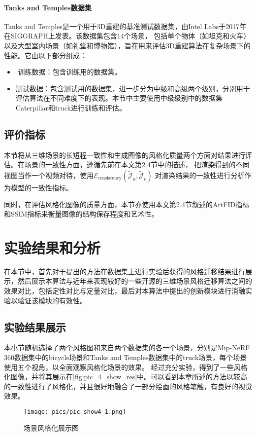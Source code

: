 \paragraph{Tanks and Temples数据集}
‌Tanks and Temples‌是一个用于3D重建的基准测试数据集，由Intel Labs于2017年在SIGGRAPH上发表。该数据集包含14个场景，
包括单个物体（如坦克和火车）以及大型室内场景（如礼堂和博物馆），旨在用来评估3D重建算法在复杂场景下的性能‌。它由以下部分组成：
\begin{itemize}
    \item‌ 训练数据：包含训练用的数据集。
    \item 测试数据：包含测试用的数据集，进一步分为中级和高级‌两个级别，分别用于评估算法在不同难度下的表现‌。本节中主要使用中级级别中的数据集Caterpillar和truck进行训练和评估。
\end{itemize}
\subsection{评价指标}
本节将从三维场景的长短程一致性和生成图像的风格化质量两个方面对结果进行评估。在场景的一致性方面，遵循先前在本文第2.4节中的描述，
把渲染得到的不同视图当作一个视频对待，使用\(\mathcal{E}_\text{consistency}(\tilde{\mathcal{J}}_u,\tilde{\mathcal{J}}_v)\)
对渲染结果的一致性进行分析作为模型的一致性指标。
\par 同时，在评估风格化图像的质量方面，本节亦使用本文第2.4节叙述的ArtFID指标和SSIM指标来衡量图像的结构保存程度和艺术性。
\section{实验结果和分析}
在本节中，首先对于提出的方法在数据集上进行实验后获得的风格迁移结果进行展示，然后展示本算法与近年来表现较好的一些开源的三维场景风格迁移算法之间的效果对比，包括定性对比与定量对比，最后对本算法中提出的创新模块进行消融实验以验证该模块的有效性。
\subsection{实验结果展示}
本小节随机选择了两个风格图和来自两个数据集的各一个场景，分别是Mip-NeRF 360数据集中的bicycle场景和Tanks and Temples数据集中的truck场景，每个场景使用五个视角，以全面观察风格化场景的效果。
经过充分实验，得到了一些风格化图像，并将其展示在\autoref{fig:pic_4_show_res}中。可以看到本章所述的方法以较高的一致性进行了风格化，并且很好地融合了一部分绘画的风格笔触，有良好的视觉效果。
\begin{figure}[htbp]
    \centering
    \texttt{[image: pics/pic\_show4\_1.png]}
    \caption{\label{fig:pic_4_show_res}场景风格化展示图}
\end{figure}
